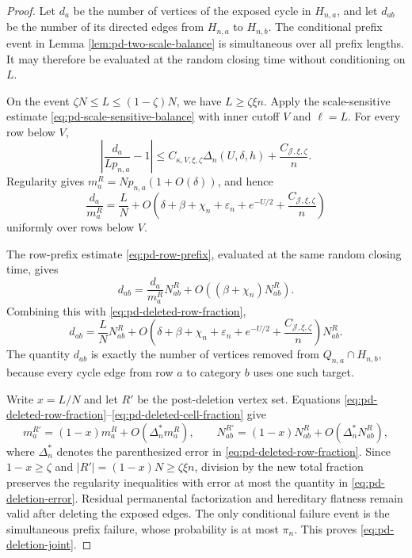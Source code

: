 \documentclass[11pt]{article}
\theoremstyle{remark}
\begin{document}
\begin{proof}
Let $d_a$ be the number of vertices of the exposed cycle in $H_{n,a}$, and let
$d_{ab}$ be the number of its directed edges from $H_{n,a}$ to $H_{n,b}$.
The conditional prefix event in Lemma \ref{lem:pd-two-scale-balance} is
simultaneous over all prefix lengths.  It may therefore be evaluated at the
random closing time without conditioning on $L$.

On the event $\zeta N\le L\le(1-\zeta)N$, we have
$L\ge\zeta\xi n$.  Apply the scale-sensitive estimate
\eqref{eq:pd-scale-sensitive-balance} with inner cutoff $V$ and $\ell=L$.
For every row below $V$,
\[
 \left|\frac{d_a}{Lp_{n,a}}-1\right|
 \le C_{\kappa,V,\xi,\zeta}
       \Delta_n(U,\delta,h)+\frac{C_{\mathcal J,\xi,\zeta}}n.
\]
Regularity gives $m_a^R=Np_{n,a}(1+O(\delta))$, and hence
\begin{equation}
 \frac{d_a}{m_a^R}
 =\frac LN+O\left(
 \delta+\beta+\chi_n+\varepsilon_n+e^{-U/2}
 +\frac{C_{\mathcal J,\xi,\zeta}}n\right)
 \label{eq:pd-deleted-row-fraction}
\end{equation}
uniformly over rows below $V$.

The row-prefix estimate \eqref{eq:pd-row-prefix}, evaluated at the same random
closing time, gives
\[
 d_{ab}
 =\frac{d_a}{m_a^R}N_{ab}^R
  +O((\beta+\chi_n)N_{ab}^R).
\]
Combining this with \eqref{eq:pd-deleted-row-fraction},
\begin{equation}
 d_{ab}
 =\frac LN N_{ab}^R
  +O\left(
 \delta+\beta+\chi_n+\varepsilon_n+e^{-U/2}
 +\frac{C_{\mathcal J,\xi,\zeta}}n\right)N_{ab}^R.
 \label{eq:pd-deleted-cell-fraction}
\end{equation}
The quantity $d_{ab}$ is exactly the number of vertices removed from
$Q_{n,a}\cap H_{n,b}$, because every cycle edge from row $a$ to category $b$
uses one such target.

Write $x=L/N$ and let $R'$ be the post-deletion vertex set.  Equations
\eqref{eq:pd-deleted-row-fraction}--\eqref{eq:pd-deleted-cell-fraction} give
\[
 m_a^{R'}=(1-x)m_a^R+O(\Delta_n^*m_a^R),
 \qquad
 N_{ab}^{R'}=(1-x)N_{ab}^R+O(\Delta_n^*N_{ab}^R),
\]
where $\Delta_n^*$ denotes the parenthesized error in
\eqref{eq:pd-deleted-row-fraction}.  Since $1-x\ge\zeta$ and
$|R'|=(1-x)N\ge\zeta\xi n$, division by the new total fraction preserves the
regularity inequalities with error at most the quantity in
\eqref{eq:pd-deletion-error}.  Residual permanental factorization and
hereditary flatness remain valid after deleting the exposed edges.  The only
conditional failure event is the simultaneous prefix failure, whose
probability is at most $\pi_n$.  This proves
\eqref{eq:pd-deletion-joint}.
\end{proof}
\end{document}
